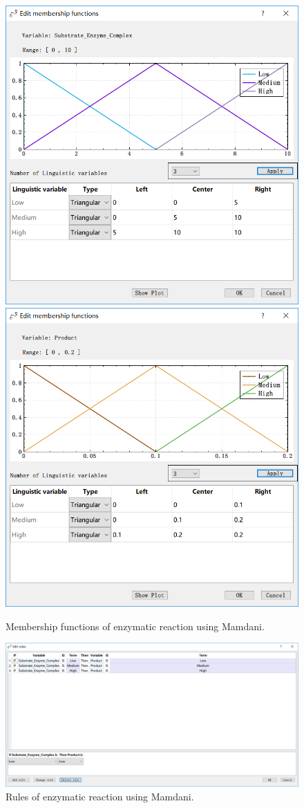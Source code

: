 \documentclass[journal,a4paper,onecolumn]{article}
\begin{document}
\begin{figure}[!hbt]
	\begin{center}
		\includegraphics[width=0.45\columnwidth]{fig41}
		\includegraphics[width=0.45\columnwidth]{fig42}
		\caption{Membership functions of enzymatic reaction using Mamdani.}
		\label{fig:Membership functions of enzyme using Mamdani.}
	\end{center}
\end{figure}

\begin{figure}[!hbt]
	\begin{center}
		\includegraphics[width=\columnwidth]{fig43}
		\caption{Rules of enzymatic reaction using Mamdani.}
		\label{fig:Rules of enzyme using Mamdani.}
	\end{center}
\end{figure}
\end{document}
